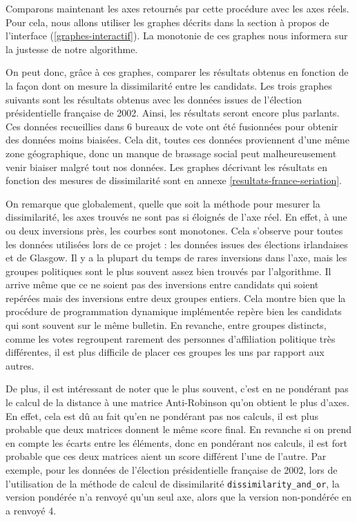 \documentclass[11pt, a4paper]{article}
\begin{document}
\bigskip
Comparons maintenant les axes retournés par cette procédure avec les axes réels. Pour cela, nous allons utiliser les graphes décrits dans la section à propos de l'interface (\ref{graphes-interactif}). La monotonie de ces graphes nous informera sur la justesse de notre algorithme.

On peut donc, grâce à ces graphes, comparer les résultats obtenus en fonction de la façon dont on mesure la dissimilarité entre les candidats. Les trois graphes suivants sont les résultats obtenus avec les données issues de l'élection présidentielle française de 2002. Ainsi, les résultats seront encore plus parlants. Ces données recueillies dans 6 bureaux de vote ont été fusionnées pour obtenir des données moins biaisées. Cela dit, toutes ces données proviennent d'une même zone géographique, donc un manque de brassage social peut malheureusement venir biaiser malgré tout nos données. Les graphes décrivant les résultats en fonction des mesures de dissimilarité sont en annexe \ref{resultats-france-seriation}.


On remarque que globalement, quelle que soit la méthode pour mesurer la dissimilarité, les axes trouvés ne sont pas si éloignés de l'axe réel. En effet, à une ou deux inversions près, les courbes sont monotones. Cela s'observe pour toutes les données utilisées lors de ce projet : les données issues des élections irlandaises et de Glasgow. Il y a la plupart du temps de rares inversions dans l'axe, mais les groupes politiques sont le plus souvent assez bien trouvés par l'algorithme. Il arrive même que ce ne soient pas des inversions entre candidats qui soient repérées mais des inversions entre deux groupes entiers. Cela montre bien que la procédure de programmation dynamique implémentée repère bien les candidats qui sont souvent sur le même bulletin. En revanche, entre groupes distincts, comme les votes regroupent rarement des personnes d'affiliation politique très différentes, il est plus difficile de placer ces groupes les uns par rapport aux autres.

De plus, il est intéressant de noter que le plus souvent, c'est en ne pondérant pas le calcul de la distance à une matrice Anti-Robinson qu'on obtient le plus d'axes. En effet, cela est dû au fait qu'en ne pondérant pas nos calculs, il est plus probable que deux matrices donnent le même score final. En revanche si on prend en compte les écarts entre les éléments, donc en pondérant nos calculs, il est fort probable que ces deux matrices aient un score différent l'une de l'autre. Par exemple, pour les données de l'élection présidentielle française de 2002, lors de l'utilisation de la méthode de calcul de dissimilarité \texttt{dissimilarity\_and\_or}, la version pondérée n'a renvoyé qu'un seul axe, alors que la version non-pondérée en a renvoyé 4.
\end{document}
